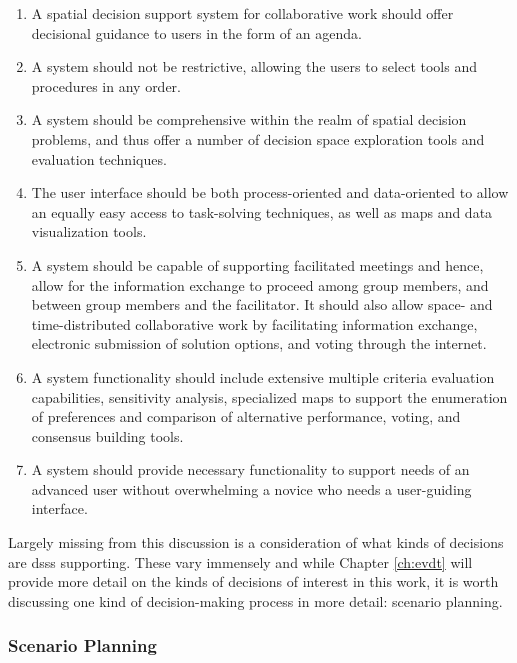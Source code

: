 \begin{enumerate}
    \setlength{\itemsep}{0pt}%
    \setlength{\parskip}{0pt}%
	\item{A spatial decision support system for collaborative work should offer decisional guidance to users in the form of an agenda.}
	\item{A system should not be restrictive, allowing the users to select tools and procedures in any order.}
	\item{A system should be comprehensive within the realm of spatial decision problems, and thus offer a number of decision space exploration tools and evaluation techniques.}
	\item{The user interface should be both process-oriented and data-oriented to allow an equally easy access to task-solving techniques, as well as maps and data visualization tools.}
	\item{A system should be capable of supporting facilitated meetings and hence, allow for the information exchange to proceed among group members, and between group members and the facilitator. It should also allow space- and time-distributed collaborative work by facilitating information exchange, electronic submission of solution options, and voting through the internet.}
	\item{A system functionality should include extensive multiple criteria evaluation capabilities, sensitivity analysis, specialized maps to support the enumeration of preferences and comparison of alternative performance, voting, and consensus building tools.}
	\item{A system should provide necessary functionality to support needs of an advanced user without overwhelming a novice who needs a user-guiding interface.}
\end{enumerate}

Largely missing from this discussion is a consideration of what kinds of decisions are \acp{dss} supporting. These vary immensely and while Chapter \ref{ch:evdt} will provide more detail on the kinds of decisions of interest in this work, it is worth discussing one kind of decision-making process in more detail: scenario planning.

\subsubsection{Scenario Planning}

